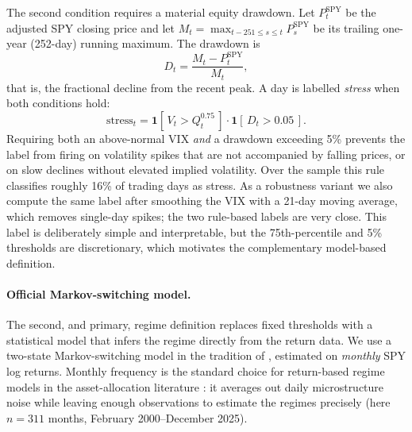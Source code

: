 The second condition requires a material equity drawdown. Let $P^{\mathrm{SPY}}_t$ be the adjusted SPY closing price and let $M_t = \max_{t-251 \le s \le t} P^{\mathrm{SPY}}_s$ be its trailing one-year (252-day) running maximum. The drawdown is
\begin{equation}
D_t = \frac{M_t - P^{\mathrm{SPY}}_t}{M_t},
\label{eq:drawdown}
\end{equation}
that is, the fractional decline from the recent peak. A day is labelled \emph{stress} when both conditions hold:
\begin{equation}
\mathrm{stress}_t = \mathbf{1}\!\left[\, V_t > Q^{0.75}_{t} \,\right]\cdot \mathbf{1}\!\left[\, D_t > 0.05 \,\right].
\label{eq:rule_stress}
\end{equation}
Requiring both an above-normal VIX \emph{and} a drawdown exceeding 5\% prevents the label from firing on volatility spikes that are not accompanied by falling prices, or on slow declines without elevated implied volatility. Over the sample this rule classifies roughly 16\% of trading days as stress. As a robustness variant we also compute the same label after smoothing the VIX with a 21-day moving average, which removes single-day spikes; the two rule-based labels are very close. This label is deliberately simple and interpretable, but the 75th-percentile and 5\% thresholds are discretionary, which motivates the complementary model-based definition.

\paragraph{Official Markov-switching model.}
The second, and primary, regime definition replaces fixed thresholds with a statistical model that infers the regime directly from the return data. We use a two-state Markov-switching model in the tradition of \citet{hamilton1989new}, estimated on \emph{monthly} SPY log returns. Monthly frequency is the standard choice for return-based regime models in the asset-allocation literature \citep{ang2002international,guidolin2007asset}: it averages out daily microstructure noise while leaving enough observations to estimate the regimes precisely (here $n = 311$ months, February 2000--December 2025).

